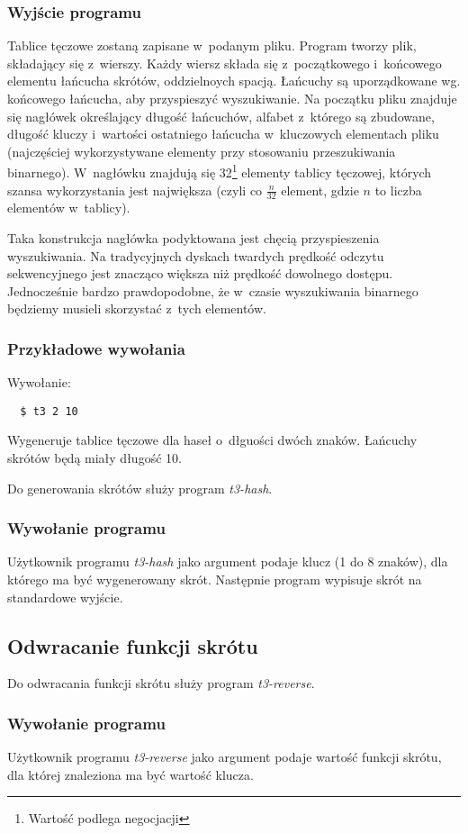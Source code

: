 \documentclass[a4paper]{scrartcl}
\begin{document}
\subsubsection{Wyjście programu}
Tablice tęczowe zostaną zapisane w~podanym pliku.
Program tworzy plik, składający się z~wierszy. Każdy wiersz składa się z~początkowego i~końcowego elementu łańcucha skrótów, oddzielnoych spacją.
Łańcuchy są uporządkowane wg. końcowego łańcucha, aby przyspieszyć wyszukiwanie.
Na początku pliku znajduje się nagłówek określający długość łańcuchów, alfabet z~którego są zbudowane, długość kluczy i~wartości ostatniego łańcucha w~kluczowych elementach pliku (najczęściej wykorzystywane elementy przy stosowaniu przeszukiwania binarnego).
W~nagłówku znajdują się 32\footnote{Wartość podlega negocjacji} elementy tablicy tęczowej, których szansa wykorzystania jest największa (czyli co $ \frac{n}{32} $ element, gdzie $n$ to liczba elementów w~tablicy).

Taka konstrukcja nagłówka podyktowana jest chęcią przyspieszenia wyszukiwania.
Na tradycyjnych dyskach twardych prędkość odczytu sekwencyjnego jest znacząco większa niż prędkość dowolnego dostępu.
Jednocześnie bardzo prawdopodobne, że w~czasie wyszukiwania binarnego będziemy musieli skorzystać z~tych elementów.

\subsubsection{Przykładowe wywołania}
Wywołanie:
\begin{lstlisting}
  $ t3 2 10
\end{lstlisting}
Wygeneruje tablice tęczowe dla haseł o~dłguości dwóch znaków. Łańcuchy skrótów będą miały długość 10.

Do generowania skrótów służy program \emph{t3-hash}.
\subsubsection{Wywołanie programu}
Użytkownik programu \emph{t3-hash} jako argument podaje klucz (1 do 8 znaków), dla którego ma być wygenerowany skrót.
Następnie program wypisuje skrót na standardowe wyjście.

\subsection{Odwracanie funkcji skrótu}
Do odwracania funkcji skrótu służy program \emph{t3-reverse}.
\subsubsection{Wywołanie programu}
Użytkownik programu \emph{t3-reverse} jako argument podaje wartość funkcji skrótu, dla której znaleziona ma być wartość klucza.
\end{document}
